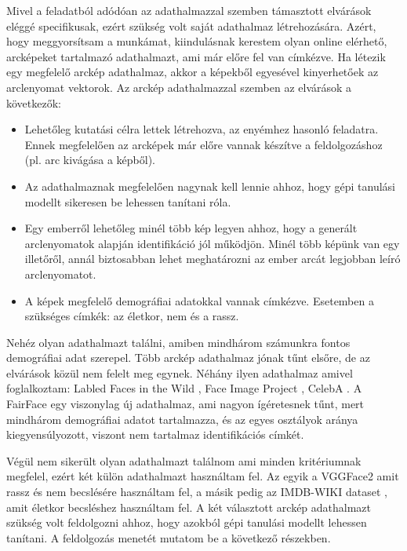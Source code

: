 Mivel a feladatból adódóan az adathalmazzal szemben támasztott elvárások eléggé specifikusak, ezért szükség volt saját adathalmaz létrehozására. Azért, hogy meggyorsítsam a munkámat, kiindulásnak kerestem olyan online elérhető, arcképeket tartalmazó adathalmazt, ami már előre fel van címkézve. Ha létezik egy megfelelő arckép adathalmaz, akkor a képekből egyesével kinyerhetőek az arclenyomat vektorok. Az arckép adathalmazzal szemben az elvárások a következők:
\begin{itemize}
	\item Lehetőleg kutatási célra lettek létrehozva, az enyémhez hasonló feladatra. Ennek megfelelően az arcképek már előre vannak készítve a feldolgozáshoz (pl. arc kivágása a képből).
	\item Az adathalmaznak megfelelően nagynak kell lennie ahhoz, hogy gépi tanulási modellt sikeresen be lehessen tanítani róla.
	\item Egy emberről lehetőleg minél több kép legyen ahhoz, hogy a generált arclenyomatok alapján identifikáció jól működjön. Minél több képünk van egy illetőről, annál biztosabban lehet meghatározni az ember arcát legjobban leíró arclenyomatot.
	\item A képek megfelelő demográfiai adatokkal vannak címkézve. Esetemben a szükséges címkék: az életkor, nem és a rassz.
\end{itemize}

Nehéz olyan adathalmazt találni, amiben mindhárom számunkra fontos demográfiai adat szerepel. Több arckép adathalmaz jónak tűnt elsőre, de az elvárások közül nem felelt meg egynek. Néhány ilyen adathalmaz amivel foglalkoztam: Labled Faces in the Wild \cite{labledfacesinthewild2008}, Face Image Project \cite{faceimageproject2014}, CelebA \cite{celebA2015}. A FairFace \cite{fairface2021} egy viszonylag új adathalmaz, ami nagyon ígéretesnek tűnt, mert mindhárom demográfiai adatot tartalmazza, és az egyes osztályok aránya kiegyensúlyozott, viszont nem tartalmaz identifikációs címkét.

Végül nem sikerült olyan adathalmazt találnom ami minden kritériumnak megfelel, ezért két külön adathalmazt használtam fel. Az egyik a VGGFace2 \cite{vggface22018} amit rassz és nem becslésére használtam fel, a másik pedig az IMDB-WIKI dataset \cite{imdbwiki2018}, amit életkor becsléshez használtam fel. A két választott arckép adathalmazt szükség volt feldolgozni ahhoz, hogy azokból gépi tanulási modellt lehessen tanítani. A feldolgozás menetét mutatom be a következő részekben.

